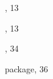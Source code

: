 \documentclass[leqno,titlepage,openany]{amsldoc}
\begin{document}
\begin{theindex}
  \indexspace

  \item {}, 13
  \item {}, 13
  \item {}, 34
  \item {} package, 36

\end{theindex}
\end{document}
